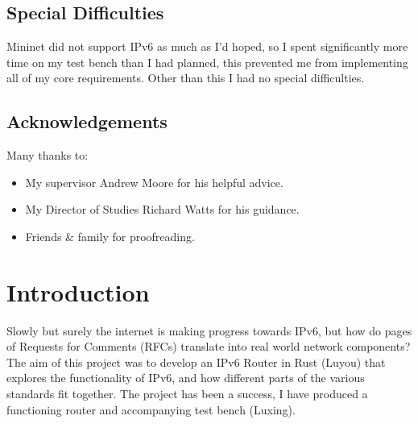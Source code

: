 \documentclass[12pt,a4paper,twoside,openright]{report}
\begin{document}
\section*{Special Difficulties}

Mininet did not support IPv6 as much as I'd hoped, so I spent significantly more time on my test bench than I had planned, this prevented me from implementing all of my core requirements.  Other than this I had no special difficulties.

\tableofcontents
{}
\listoffigures
{}

\newpage
\section*{Acknowledgements}

Many thanks to:
\begin{itemize}
\item My supervisor Andrew Moore for his helpful advice.
\item My Director of Studies Richard Watts for his guidance.
\item Friends \& family for proofreading.
\end{itemize}


\pagestyle{headings}

\chapter{Introduction}
\label{chap::introduction}
Slowly but surely the internet is making progress towards IPv6, but how do pages of Requests for Comments (RFCs) translate into real world network components? The aim of this project was to develop an IPv6 Router in Rust (Luyou) that explores the functionality of IPv6, and how different parts of the various standards fit together. The project has been a success, I have produced a functioning router and accompanying test bench (Luxing).

\bigskip
\end{document}
